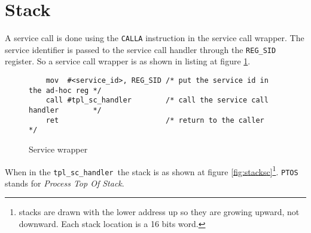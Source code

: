 \documentclass[11pt, oneside]{article}   	%
\newcommand{\sch}{\lstinline{tpl_sc_handler}}
\begin{document}

\section{Stack}

A service call is done using the \lstinline{CALLA} instruction in the service call wrapper. The service identifier is passed to the service call handler through the \lstinline{REG_SID} register. So a service call wrapper is as shown in listing at figure \ref{lst:wrapper}.

\begin{figure}[h]
\caption{Service wrapper}
\begin{lstlisting}
    mov  #<service_id>, REG_SID /* put the service id in the ad-hoc reg */
    call #tpl_sc_handler        /* call the service call handler        */
    ret                         /* return to the caller                 */
\end{lstlisting}
\label{lst:wrapper}
\end{figure}

When in the \sch\ the stack is as shown at figure \ref{fig:stacksc}\footnote{stacks are drawn with the lower address up so they are growing upward, not downward. Each stack location is a 16 bits word.}. \texttt{PTOS} stands for \emph{Process Top Of Stack}.
\end{document}

